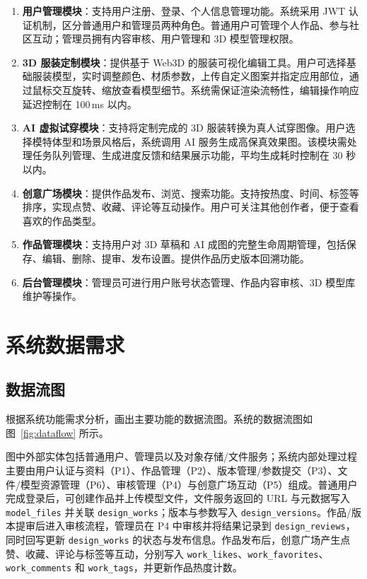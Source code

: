 \documentclass[twoside]{thesis-cls-Miya} %
\begin{document}
\begin{enumerate}[label=(\arabic*)]
	\item \textbf{用户管理模块}：支持用户注册、登录、个人信息管理功能。系统采用 JWT 认证机制，区分普通用户和管理员两种角色。普通用户可管理个人作品、参与社区互动；管理员拥有内容审核、用户管理和 3D 模型管理权限。
	\item \textbf{3D 服装定制模块}：提供基于 Web3D 的服装可视化编辑工具。用户可选择基础服装模型，实时调整颜色、材质参数，上传自定义图案并指定应用部位，通过鼠标交互旋转、缩放查看模型细节。系统需保证渲染流畅性，编辑操作响应延迟控制在 100\,ms 以内。
	\item \textbf{AI 虚拟试穿模块}：支持将定制完成的 3D 服装转换为真人试穿图像。用户选择模特体型和场景风格后，系统调用 AI 服务生成高保真效果图。该模块需处理任务队列管理、生成进度反馈和结果展示功能，平均生成耗时控制在 30 秒以内。
	\item \textbf{创意广场模块}：提供作品发布、浏览、搜索功能。支持按热度、时间、标签等排序，实现点赞、收藏、评论等互动操作。用户可关注其他创作者，便于查看喜欢的作品类型。
	\item \textbf{作品管理模块}：支持用户对 3D 草稿和 AI 成图的完整生命周期管理，包括保存、编辑、删除、提审、发布设置。提供作品历史版本回溯功能。
	\item \textbf{后台管理模块}：管理员可进行用户账号状态管理、作品内容审核、3D 模型库维护等操作。
\end{enumerate}

\section{系统数据需求}

\subsection{数据流图}

根据系统功能需求分析，画出主要功能的数据流图。系统的数据流图如图~\ref{fig:dataflow} 所示。

图中外部实体包括普通用户、管理员以及对象存储/文件服务；系统内部处理过程主要由用户认证与资料（P1）、作品管理（P2）、版本管理/参数提交（P3）、文件/模型资源管理（P6）、审核管理（P4）与创意广场互动（P5）组成。普通用户完成登录后，可创建作品并上传模型文件，文件服务返回的 URL 与元数据写入 \texttt{model\_files} 并关联 \texttt{design\_works}；版本与参数写入 \texttt{design\_versions}。作品/版本提审后进入审核流程，管理员在 P4 中审核并将结果记录到 \texttt{design\_reviews}，同时回写更新 \texttt{design\_works} 的状态与发布信息。作品发布后，创意广场产生点赞、收藏、评论与标签等互动，分别写入 \texttt{work\_likes}、\texttt{work\_favorites}、\texttt{work\_comments} 和 \texttt{work\_tags}，并更新作品热度计数。
\end{document}
